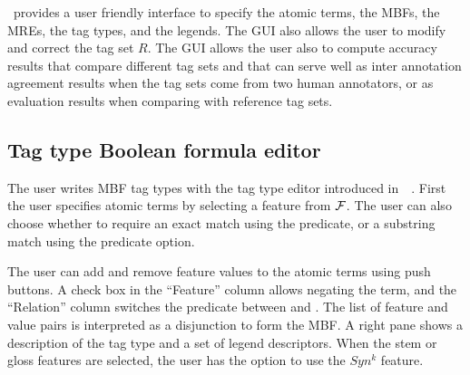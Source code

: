 \framework~provides a user friendly interface to specify the 
atomic terms, the MBFs, the MREs, 
the tag types, and the legends. 
The GUI also allows the user to modify and correct the 
tag set $R$. 
The GUI allows the user also to compute accuracy results 
that compare different tag sets and that can serve well as 
inter annotation agreement results
when the tag sets come from two human annotators, 
or as evaluation results when comparing with reference tag sets.



\subsection{Tag type Boolean formula editor}
The user writes MBF tag types with the tag type editor introduced in~~\citeyear{JaZaMatar}. %
First the user specifies atomic terms by selecting a feature from ${\cal F}$. 
The user can also choose whether to require an exact match using the
 predicate, or a substring match using the
 predicate option.

The user can add and remove feature values to the atomic terms 
using push buttons. 
A check box in the ``Feature'' column allows negating the term, and the
``Relation'' column switches the predicate between 
 and . 
The list of feature and value pairs is interpreted as a disjunction to form
the MBF. 
A right pane shows a description of the tag type and a set of legend 
descriptors. 
When the stem or gloss features are selected, the user has the option to 
use the $Syn^k$ feature. 

